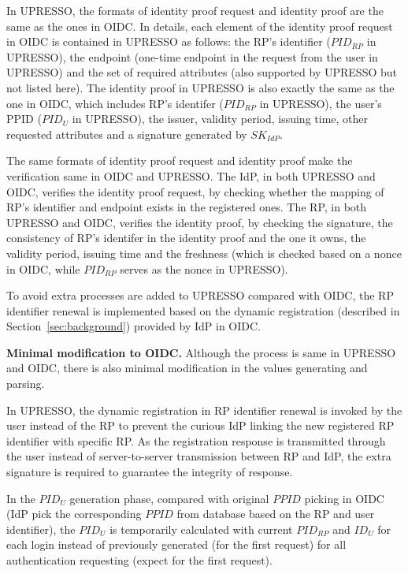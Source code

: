 In UPRESSO, the formats of identity proof request and identity proof are the same as the ones in OIDC. In details, each element of the identity proof request in OIDC is contained in UPRESSO as follows: the RP's identifier ($PID_{RP}$ in UPRESSO), the endpoint (one-time endpoint in the request from the user in UPRESSO) and the set of required attributes (also supported by UPRESSO but not listed here). The identity proof in UPRESSO is also exactly the same as the one in OIDC, which includes RP's identifer ($PID_{RP}$ in UPRESSO), the user's PPID ($PID_U$ in UPRESSO), the issuer, validity period, issuing time, other requested attributes and a signature generated by $SK_{IdP}$.

The same formats of identity proof request and identity proof make the verification same in OIDC and UPRESSO. The IdP, in both UPRESSO and OIDC, verifies the identity proof request, by checking whether the mapping of RP's identifier and endpoint exists in the registered ones. The RP, in both UPRESSO and OIDC, verifies the identity proof, by checking the signature, the consistency of RP's identifer in the identity proof and the one it owns, the validity period, issuing time and the freshness (which is checked based on a nonce in  OIDC, while  $PID_{RP}$ serves as the nonce in UPRESSO).

To avoid extra processes are added to UPRESSO compared with OIDC, the RP identifier renewal is implemented based on the dynamic registration (described in Section~\ref{sec:background}) provided by IdP in OIDC.

\vspace{1mm}\noindent \textbf{Minimal modification to OIDC.} 
Although the process is same in UPRESSO and OIDC, there is also minimal modification in the values generating and parsing.

In UPRESSO, the dynamic registration in RP identifier renewal is invoked by the user instead of the RP to prevent the curious IdP linking the new registered RP identifier with specific RP.
As the registration response is transmitted through the user instead of server-to-server transmission between RP and IdP, the extra signature is required to guarantee the integrity of response. 

In the $PID_U$ generation phase, compared with original $PPID$ picking in OIDC (IdP pick the corresponding $PPID$ from database based on the RP and user identifier), the $PID_U$ is temporarily calculated with current $PID_{RP}$ and $ID_U$ for each login instead of previously generated (for the first request) for all authentication requesting (expect for the first request).

